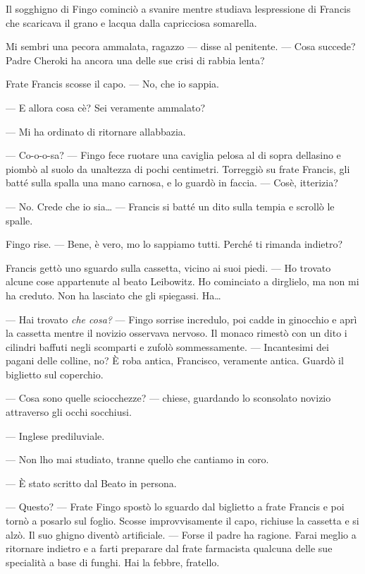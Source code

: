 Il sogghigno di Fingo cominciò a svanire mentre studiava
l\textquotesingle espressione di Francis che scaricava il grano e
l\textquotesingle acqua dalla capricciosa somarella.

Mi sembri una pecora ammalata, ragazzo --- disse al penitente. --- Cosa
succede? Padre Cheroki ha ancora una delle sue crisi di rabbia lenta?

Frate Francis scosse il capo. --- No, che io sappia.

--- E allora cosa c\textquotesingle è? Sei veramente ammalato?

--- Mi ha ordinato di ritornare all\textquotesingle abbazia.

--- Co-o-o-sa? --- Fingo fece ruotare una caviglia pelosa al di sopra
dell\textquotesingle asino e piombò al suolo da
un\textquotesingle altezza di pochi centimetri. Torreggiò su frate
Francis, gli batté sulla spalla una mano carnosa, e lo guardò in faccia.
--- Cos\textquotesingle è, itterizia?

--- No. Crede che io sia\ldots{} --- Francis si batté un dito sulla
tempia e scrollò le spalle.

Fingo rise. --- Bene, è vero, mo lo sappiamo tutti. Perché ti rimanda
indietro?

Francis gettò uno sguardo sulla cassetta, vicino ai suoi piedi. --- Ho
trovato alcune cose appartenute al beato Leibowitz. Ho cominciato a
dirglielo, ma non mi ha creduto. Non ha lasciato che gli spiegassi.
Ha\ldots{}

--- Hai trovato \emph{che cosa?} --- Fingo sorrise incredulo, poi cadde
in ginocchio e aprì la cassetta mentre il novizio osservava nervoso. Il
monaco rimestò con un dito i cilindri baffuti negli scomparti e zufolò
sommessamente. --- Incantesimi dei pagani delle colline, no? È roba
antica, Francisco, veramente antica. Guardò il biglietto sul coperchio.

--- Cosa sono quelle sciocchezze? --- chiese, guardando lo sconsolato
novizio attraverso gli occhi socchiusi.

--- Inglese prediluviale.

--- Non l\textquotesingle ho mai studiato, tranne quello che cantiamo in
coro.

--- È stato scritto dal Beato in persona.

--- Questo? --- Frate Fingo spostò lo sguardo dal biglietto a frate
Francis e poi tornò a posarlo sul foglio. Scosse improvvisamente il
capo, richiuse la cassetta e si alzò. Il suo ghigno diventò artificiale.
--- Forse il padre ha ragione. Farai meglio a ritornare indietro e a
farti preparare dal frate farmacista qualcuna delle sue specialità a
base di funghi. Hai la febbre, fratello.

